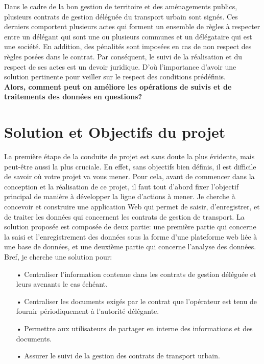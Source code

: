 \documentclass[a4paper]{report}
\begin{document}
\begin{doublespace}
	Dans le cadre de la bon gestion de territoire et des aménagements publics,
	plusieurs
	contrats de gestion déléguée du transport urbain sont signés. Ces derniers
	comportent
	plusieurs actes qui forment un ensemble de règles à respecter entre un
	délégant qui
	sont une ou plusieurs communes et un délégataire qui est une société. En
	addition,
	des pénalités sont imposées en cas de non respect des règles posées dans le
	contrat.
	Par conséquent, le suivi de la réalisation et du respect de ses actes est
	un devoir
	juridique. D’où l'importance d'avoir une solution pertinente pour veiller
	sur le
	respect des conditions prédéfinis.
	\\\textbf{Alors, comment peut on améliore les opérations de suivis et de
		traitements des données en questions?}
	\section{Solution et Objectifs du projet}

	La première étape de la conduite de projet est sans doute la plus évidente,
	mais peut-être
	aussi la plus cruciale. En effet, sans objectifs bien définis, il est
	difficile de savoir où votre projet
	va vous mener. Pour cela, avant de commencer dans la conception et la
	réalisation de ce projet,
	il faut tout d’abord fixer l’objectif principal de manière à développer la
	ligne d’actions à mener.
	Je cherche à concevoir et construire une application Web qui permet de
	saisir, d'enregistrer,
	et de traiter les données qui concernent les contrats de gestion de
	transport. La
	solution proposée est composée de deux partie: une première partie qui
	concerne la
	saisi et l'enregistrement des données sous la forme d'une plateforme web
	liée à une base de données, et une deuxième partie qui concerne l'analyse des données.
	Bref, je cherche une solution pour:
	\begin{itemize}
		\item[•] Centraliser l’information contenue dans les contrats de gestion
		      déléguée et
		      leurs avenants le cas échéant.
		\item[•] Centraliser les documents exigés par le contrat que l’opérateur
		      est tenu de
		      fournir périodiquement à l’autorité délégante.
		\item[•] Permettre aux utilisateurs de partager en interne des
		      informations et des
		      documents.
		\item[•] Assurer le suivi de la gestion des contrats de transport urbain.
	\end{itemize}

\end{doublespace}
\end{document}

